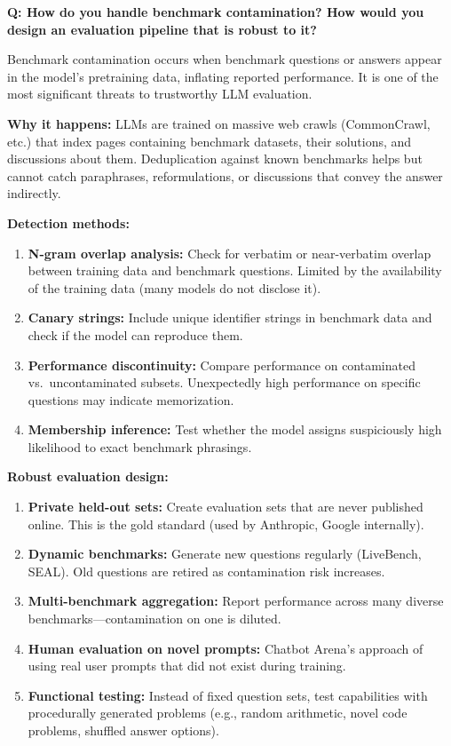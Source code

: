 \begin{interviewq}
\textbf{Q: How do you handle benchmark contamination? How would you design
an evaluation pipeline that is robust to it?}

 \quad {} \quad \badgefreq{\freqmed}

\stronganswer
Benchmark contamination occurs when benchmark questions or answers appear in
the model's pretraining data, inflating reported performance.  It is one of the
most significant threats to trustworthy LLM evaluation.

\textbf{Why it happens:}  LLMs are trained on massive web crawls (CommonCrawl,
etc.) that index pages containing benchmark datasets, their solutions, and
discussions about them.  Deduplication against known benchmarks helps but cannot
catch paraphrases, reformulations, or discussions that convey the answer
indirectly.

\textbf{Detection methods:}
\begin{enumerate}
    \item \textbf{N-gram overlap analysis:} Check for verbatim or near-verbatim
          overlap between training data and benchmark questions.  Limited by
          the availability of the training data (many models do not disclose it).
    \item \textbf{Canary strings:} Include unique identifier strings in benchmark
          data and check if the model can reproduce them.
    \item \textbf{Performance discontinuity:} Compare performance on contaminated
          vs.\ uncontaminated subsets.  Unexpectedly high performance on specific
          questions may indicate memorization.
    \item \textbf{Membership inference:} Test whether the model assigns
          suspiciously high likelihood to exact benchmark phrasings.
\end{enumerate}

\textbf{Robust evaluation design:}
\begin{enumerate}
    \item \textbf{Private held-out sets:} Create evaluation sets that are never
          published online.  This is the gold standard (used by Anthropic, Google
          internally).
    \item \textbf{Dynamic benchmarks:} Generate new questions regularly
          (LiveBench, SEAL).  Old questions are retired as contamination risk
          increases.
    \item \textbf{Multi-benchmark aggregation:} Report performance across
          many diverse benchmarks---contamination on one is diluted.
    \item \textbf{Human evaluation on novel prompts:} Chatbot Arena's approach
          of using real user prompts that did not exist during training.
    \item \textbf{Functional testing:} Instead of fixed question sets, test
          capabilities with procedurally generated problems (e.g., random
          arithmetic, novel code problems, shuffled answer options).
\end{enumerate}


\end{interviewq}
